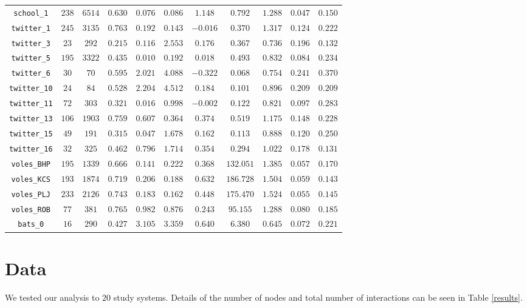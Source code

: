 \documentclass[10pt]{article}
\begin{document}
\begin{multicols}{2}
\begin{table*}[t]
\begin{tabular}{c|cccccccccc}
\verb|school_1| & $238$ & $6514$ & $0.630$ & $0.076$ & $0.086$ & $1.148$ & $0.792$ & $1.288$ & $0.047$ & $0.150$\\
\verb|twitter_1| & $245$ & $3135$ & $0.763$ & $0.192$ & $0.143$ & $-0.016$ & $0.370$ & $1.317$ & $0.124$ & $0.222$\\
\verb|twitter_3| & $23$ & $292$ & $0.215$ & $0.116$ & $2.553$ & $0.176$ & $0.367$ & $0.736$ & $0.196$ & $0.132$\\
\verb|twitter_5| & $195$ & $3322$ & $0.435$ & $0.010$ & $0.192$ & $0.018$ & $0.493$ & $0.832$ & $0.084$ & $0.234$\\
\verb|twitter_6| & $30$ & $70$ & $0.595$ & $2.021$ & $4.088$ & $-0.322$ & $0.068$ & $0.754$ & $0.241$ & $0.370$\\
\verb|twitter_10| & $24$ & $84$ & $0.528$ & $2.204$ & $4.512$ & $0.184$ & $0.101$ & $0.896$ & $0.209$ & $0.209$\\
\verb|twitter_11| & $72$ & $303$ & $0.321$ & $0.016$ & $0.998$ & $-0.002$ & $0.122$ & $0.821$ & $0.097$ & $0.283$\\
\verb|twitter_13| & $106$ & $1903$ & $0.759$ & $0.607$ & $0.364$ & $0.374$ & $0.519$ & $1.175$ & $0.148$ & $0.228$\\
\verb|twitter_15| & $49$ & $191$ & $0.315$ & $0.047$ & $1.678$ & $0.162$ & $0.113$ & $0.888$ & $0.120$ & $0.250$\\
\verb|twitter_16| & $32$ & $325$ & $0.462$ & $0.796$ & $1.714$ & $0.354$ & $0.294$ & $1.022$ & $0.178$ & $0.131$\\
\verb|voles_BHP| & $195$ & $1339$ & $0.666$ & $0.141$ & $0.222$ & $0.368$ & $132.051$ & $1.385$ & $0.057$ & $0.170$\\
\verb|voles_KCS| & $193$ & $1874$ & $0.719$ & $0.206$ & $0.188$ & $0.632$ & $186.728$ & $1.504$ & $0.059$ & $0.143$\\
\verb|voles_PLJ| & $233$ & $2126$ & $0.743$ & $0.183$ & $0.162$ & $0.448$ & $175.470$ & $1.524$ & $0.055$ & $0.145$\\
\verb|voles_ROB| & $77$ & $381$ & $0.765$ & $0.982$ & $0.876$ & $0.243$ & $95.155$ & $1.288$ & $0.080$ & $0.185$\\
\verb|bats_0| & $16$ & $290$ & $0.427$ & $3.105$ & $3.359$ & $0.640$ & $6.380$ & $0.645$ & $0.072$ & $0.221$\\
\bottomrule
\end{tabular}
\end{table*}

\section{Data}
\label{data}
We tested our analysis to $20$ study systems. Details of the number of nodes and total number of interactions can be seen in Table \ref{results}.


\end{multicols}
\end{document}
